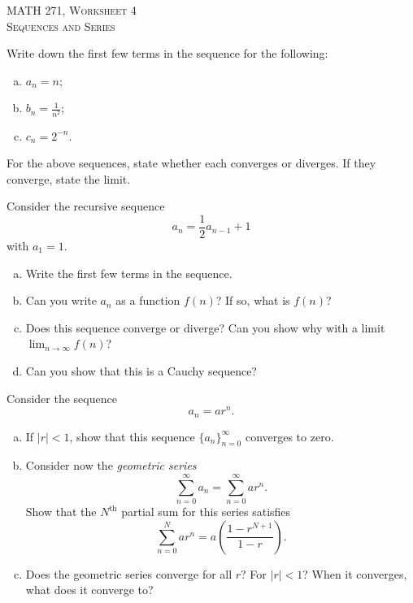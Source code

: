 \documentclass[12pt]{article} %
\begin{document}
\begin{center}
   \textsc{\large MATH 271, Worksheet 4}\\
   \textsc{Sequences and Series}
\end{center}
\vspace{.5cm}

\begin{problem}
Write down the first few terms in the sequence for the following:
\begin{enumerate}[(a)]
    \item $a_n = n$;
    \item $b_n = \frac{1}{n^2}$;
    \item $c_n = 2^{-n}$.
\end{enumerate}
\end{problem}

\begin{problem}
For the above sequences, state whether each converges or diverges.  If they converge, state the limit.
\end{problem}

\begin{problem}
Consider the recursive sequence
\[
a_n = \frac{1}{2} a_{n-1} + 1
\]
with $a_1 = 1$.  
\begin{enumerate}[(a)]
    \item Write the first few terms in the sequence.
    \item Can you write $a_n$ as a function $f(n)$? If so, what is $f(n)$?
    \item Does this sequence converge or diverge? Can you show why with a limit $\lim_{n\to \infty} f(n)$?
    \item Can you show that this is a Cauchy sequence?
\end{enumerate}
\end{problem}

\begin{problem}
Consider the sequence
\[
a_n = a r^n.
\]
\begin{enumerate}[(a)]
    \item If $|r|<1$, show that this sequence $\{a_n\}_{n=0}^\infty$ converges to zero.
    \item Consider now the \emph{geometric series}
    \[
    \sum_{n=0}^\infty a_n = \sum_{n=0}^\infty ar^n.
    \]
    Show that the $N^\textrm{th}$ partial sum for this series satisfies
    \[
    \sum_{n=0}^N ar^n = a\left( \frac{1-r^{N+1}}{1-r}\right).
    \]
    \item Does the geometric series converge for all $r$? For $|r|<1$? When it converges, what does it converge to?
\end{enumerate}
\end{problem}
\end{document}
